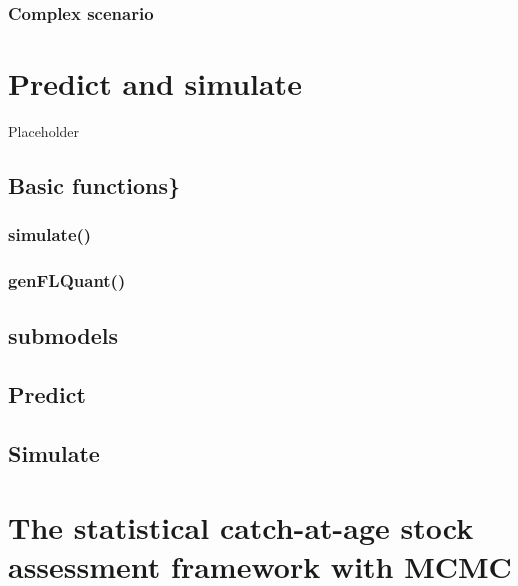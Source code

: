 \documentclass[
]{book}
\begin{document}
\hypertarget{complex-scenario}{%
\subsection{Complex scenario}\label{complex-scenario}}

\hypertarget{predict-and-simulate}{%
\chapter{\texorpdfstring{Predict and simulate \label{sec:predsim}}{Predict and simulate }}\label{predict-and-simulate}}

Placeholder

\hypertarget{basic-functions}{%
\section{Basic functions\}}\label{basic-functions}}

\hypertarget{simulate}{%
\subsection{simulate()}\label{simulate}}

\hypertarget{genflquant}{%
\subsection{genFLQuant()}\label{genflquant}}

\hypertarget{submodels}{%
\section{submodels}\label{submodels}}

\hypertarget{predict}{%
\section{Predict}\label{predict}}

\hypertarget{simulate-1}{%
\section{Simulate}\label{simulate-1}}

\hypertarget{the-statistical-catch-at-age-stock-assessment-framework-with-mcmc}{%
\chapter{\texorpdfstring{The statistical catch-at-age stock assessment framework with MCMC \label{sec:mcmc}}{The statistical catch-at-age stock assessment framework with MCMC }}\label{the-statistical-catch-at-age-stock-assessment-framework-with-mcmc}}
\end{document}
